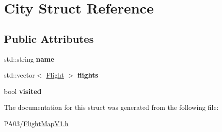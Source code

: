 \hypertarget{struct_city}{}\section{City Struct Reference}
\label{struct_city}
\subsection*{Public Attributes}
\begin{DoxyCompactItemize}
\item 
\mbox{\label{struct_city_afea8cd8800a8600fa54af37ac05bf177}} 
std\+::string {\bfseries name}
\item 
\mbox{\label{struct_city_a2daefb54f171bc17af150bd7dd7b1c83}} 
std\+::vector$<$ \hyperlink{struct_flight}{Flight} $>$ {\bfseries flights}
\item 
\mbox{\label{struct_city_a3ad0293cf12ceb3e9754b93f78c019ac}} 
bool {\bfseries visited}
\end{DoxyCompactItemize}


The documentation for this struct was generated from the following file\+:\begin{DoxyCompactItemize}
\item 
P\+A03/\hyperlink{_flight_map_v1_8h}{Flight\+Map\+V1.\+h}\end{DoxyCompactItemize}
